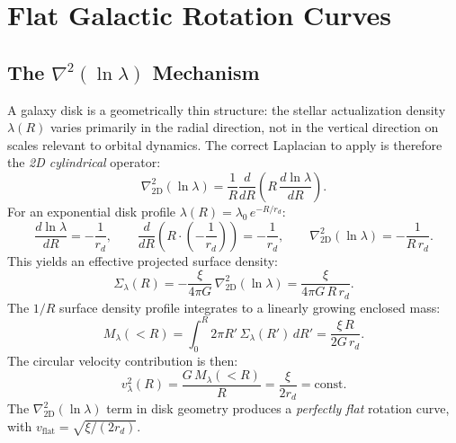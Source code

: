 \documentclass[11pt,a4paper]{article}
\theoremstyle{plain}
\theoremstyle{definition}
\theoremstyle{remark}
\begin{document}
\section{Flat Galactic Rotation Curves}
\label{sec:rotation}

\subsection{The $\nabla^2(\ln\lambda)$ Mechanism}

A galaxy disk is a geometrically thin structure: the stellar actualization
density $\lambda(R)$ varies primarily in the radial direction, not in the
vertical direction on scales relevant to orbital dynamics.
The correct Laplacian to apply is therefore the \emph{2D cylindrical} operator:
\begin{equation}
  \nabla^2_\text{2D}(\ln\lambda)
  = \frac{1}{R}\frac{d}{dR}\!\left(R\,\frac{d\ln\lambda}{dR}\right).
  \label{eq:laplacian_2D}
\end{equation}
For an exponential disk profile $\lambda(R) = \lambda_0\,e^{-R/r_d}$:
\begin{equation}
  \frac{d\ln\lambda}{dR} = -\frac{1}{r_d},
  \qquad
  \frac{d}{dR}\!\left(R\cdot\left(-\frac{1}{r_d}\right)\right)
  = -\frac{1}{r_d},
  \qquad
  \nabla^2_\text{2D}(\ln\lambda) = -\frac{1}{R\,r_d}.
  \label{eq:lnlambda_laplacian}
\end{equation}
This yields an effective projected surface density:
\begin{equation}
  \Sigma_\lambda(R) = -\frac{\xi}{4\pi G}\,\nabla^2_\text{2D}(\ln\lambda)
  = \frac{\xi}{4\pi G\,R\,r_d}.
  \label{eq:Sigma_lambda_profile}
\end{equation}
The $1/R$ surface density profile integrates to a linearly growing enclosed mass:
\begin{equation}
  M_\lambda(<R) = \int_0^R 2\pi R'\,\Sigma_\lambda(R')\,dR'
  = \frac{\xi\,R}{2G\,r_d}.
  \label{eq:M_lambda}
\end{equation}
The circular velocity contribution is then:
\begin{equation}
  v^2_\lambda(R) = \frac{G\,M_\lambda(<R)}{R} = \frac{\xi}{2r_d} = \mathrm{const.}
  \label{eq:flat_curve}
\end{equation}
The $\nabla^2_\text{2D}(\ln\lambda)$ term in disk geometry produces a
\emph{perfectly flat} rotation curve, with
$v_{\mathrm{flat}} = \sqrt{\xi/(2r_d)}$.
\end{document}
